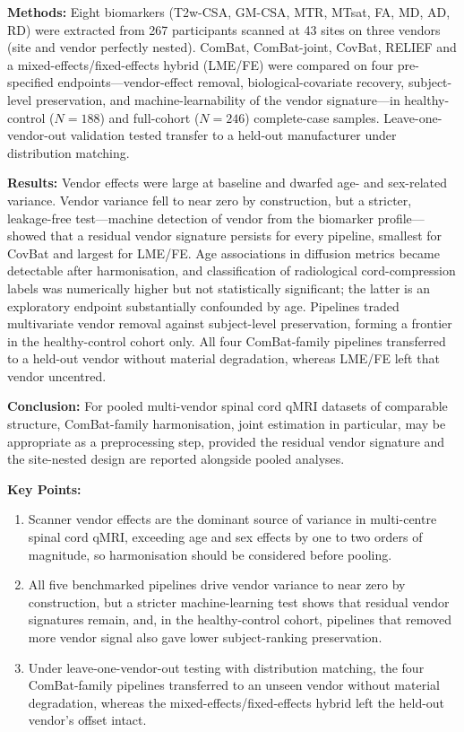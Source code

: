 \documentclass[12pt,a4paper]{article}
\begin{document}
\noindent\textbf{Methods:} Eight biomarkers (T2w-CSA, GM-CSA, MTR, MTsat, FA, MD, AD, RD) were extracted from 267 participants scanned at 43 sites on three vendors (site and vendor perfectly nested). ComBat, ComBat-joint, CovBat, RELIEF and a mixed-effects/fixed-effects hybrid (LME/FE) were compared on four pre-specified endpoints---vendor-effect removal, biological-covariate recovery, subject-level preservation, and machine-learnability of the vendor signature---in healthy-control ($N=188$) and full-cohort ($N=246$) complete-case samples. Leave-one-vendor-out validation tested transfer to a held-out manufacturer under distribution matching.

\noindent\textbf{Results:} Vendor effects were large at baseline and dwarfed age- and sex-related variance. Vendor variance fell to near zero by construction, but a stricter, leakage-free test---machine detection of vendor from the biomarker profile---showed that a residual vendor signature persists for every pipeline, smallest for CovBat and largest for LME/FE. Age associations in diffusion metrics became detectable after harmonisation, and classification of radiological cord-compression labels was numerically higher but not statistically significant; the latter is an exploratory endpoint substantially confounded by age. Pipelines traded multivariate vendor removal against subject-level preservation, forming a frontier in the healthy-control cohort only. All four ComBat-family pipelines transferred to a held-out vendor without material degradation, whereas LME/FE left that vendor uncentred.

\noindent\textbf{Conclusion:} For pooled multi-vendor spinal cord qMRI datasets of comparable structure, ComBat-family harmonisation, joint estimation in particular, may be appropriate as a preprocessing step, provided the residual vendor signature and the site-nested design are reported alongside pooled analyses.

\vspace{4mm}
\noindent\textbf{Key Points:}
\begin{enumerate}[nosep,leftmargin=*]
  \item Scanner vendor effects are the dominant source of variance in multi-centre spinal cord qMRI, exceeding age and sex effects by one to two orders of magnitude, so harmonisation should be considered before pooling.
  \item All five benchmarked pipelines drive vendor variance to near zero by construction, but a stricter machine-learning test shows that residual vendor signatures remain, and, in the healthy-control cohort, pipelines that removed more vendor signal also gave lower subject-ranking preservation.
  \item Under leave-one-vendor-out testing with distribution matching, the four ComBat-family pipelines transferred to an unseen vendor without material degradation, whereas the mixed-effects/fixed-effects hybrid left the held-out vendor's offset intact.
\end{enumerate}
\end{document}
